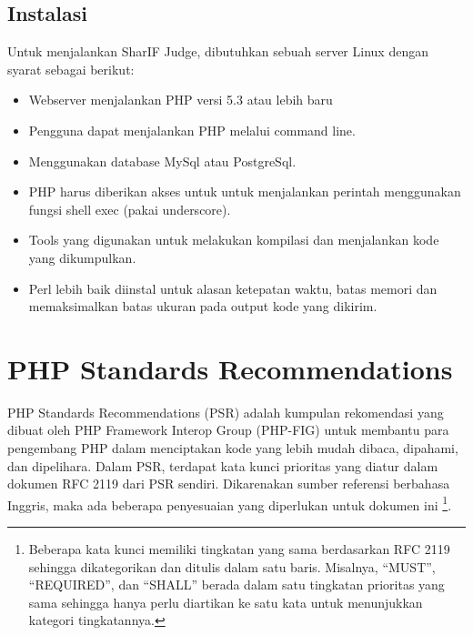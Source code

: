 \subsection{Instalasi}
Untuk menjalankan SharIF Judge, dibutuhkan sebuah server Linux dengan syarat sebagai berikut:
\begin{itemize}
	\item Webserver menjalankan PHP versi 5.3 atau lebih baru
	\item Pengguna dapat menjalankan PHP melalui command line.
	\item Menggunakan database MySql atau PostgreSql.
	\item PHP harus diberikan akses untuk untuk menjalankan perintah menggunakan fungsi shell exec (pakai underscore).
	\item Tools yang digunakan untuk melakukan kompilasi dan menjalankan kode yang dikumpulkan.
	\item Perl lebih baik diinstal untuk alasan ketepatan waktu, batas memori dan memaksimalkan batas ukuran pada output kode yang dikirim.
\end{itemize}




\section{PHP Standards Recommendations}
\label{sec:psr}

PHP Standards Recommendations (PSR) adalah kumpulan rekomendasi yang dibuat oleh PHP Framework Interop Group (PHP-FIG) untuk membantu para pengembang PHP dalam menciptakan kode yang lebih mudah dibaca, dipahami, dan dipelihara. 
Dalam PSR, terdapat kata kunci prioritas yang diatur dalam dokumen RFC 2119 dari PSR sendiri. Dikarenakan sumber referensi berbahasa Inggris, maka ada beberapa penyesuaian yang diperlukan untuk dokumen ini \footnote{Beberapa kata kunci memiliki tingkatan yang sama berdasarkan RFC 2119 sehingga dikategorikan dan ditulis dalam satu baris. Misalnya, ``MUST'', ``REQUIRED'', dan ``SHALL'' berada dalam satu tingkatan prioritas yang sama sehingga hanya perlu diartikan ke satu kata untuk menunjukkan kategori tingkatannya. }.

